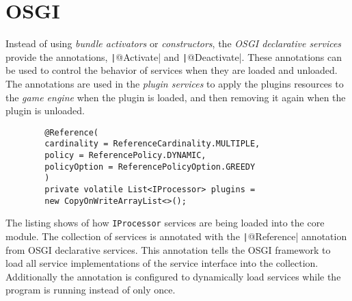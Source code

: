 \section{OSGI}
Instead of using \emph{bundle activators} or \emph{constructors},
the \emph{OSGI declarative services} provide the annotations,
\texttt|@Activate| and \texttt|@Deactivate|.
These annotations can be used to control the behavior of services when they
are loaded and unloaded.
The annotations are used in the \emph{plugin services} to apply the plugins
resources to the \emph{game engine} when the plugin is loaded,
and then removing it again when the plugin is unloaded.

\begin{listing}
    \begin{verbatim}
        @Reference(
        cardinality = ReferenceCardinality.MULTIPLE,
        policy = ReferencePolicy.DYNAMIC,
        policyOption = ReferencePolicyOption.GREEDY
        )
        private volatile List<IProcessor> plugins =
        new CopyOnWriteArrayList<>();
    \end{verbatim}
    \caption{The listing shows of how \texttt{IProcessor} services are being
    loaded into the core module.
    The collection of services is annotated with the
    \texttt|@Reference| annotation from OSGI declarative services.
    This annotation tells the OSGI framework to load all service
    implementations of the service interface into the collection.
    Additionally the annotation is configured to dynamically load services
while the program is running instead of only once.}
\label{lst:osgi-ref}
\end{listing}
